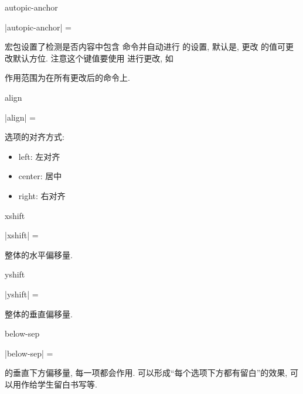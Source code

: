\documentclass{l3doc}
\begin{document}
\begin{documentation}
\begin{function}[added = 2021-12-25, updated = 2022-01-09]{autopic-anchor}
  \begin{syntax}
    |autopic-anchor| =  
  \end{syntax}
   宏包设置了检测是否内容中包含  命令并自动进行  的设置, 默认是, 更改  的值可更改默认方位.
  注意这个键值要使用  进行更改, 如
  \lstset{ linewidth = 0.4\linewidth }
  \begin{LaTeXdemo}
  \end{LaTeXdemo}
  作用范围为在所有更改后的命令上.
\end{function}
\begin{function}{align}
  \begin{syntax}
    |align| =  
  \end{syntax}
  选项的对齐方式:
  \begin{itemize}
    \item left: 左对齐
    \item center: 居中
    \item right: 右对齐
  \end{itemize}
\end{function}


\begin{function}{xshift}
  \begin{syntax}
    |xshift| = 
  \end{syntax}
  整体的水平偏移量.
\end{function}

\begin{function}[updated = 2021-12-25]{yshift}
  \begin{syntax}
    |yshift| = 
  \end{syntax}
  整体的垂直偏移量.
\end{function}

\begin{function}[added = 2021-12-25, updated = 2022-01-09]{below-sep}
  \begin{syntax}
    |below-sep| = 
  \end{syntax}
   的垂直下方偏移量, 每一项都会作用. 可以形成“每个选项下方都有留白”的效果, 可以用作给学生留白书写等.
\end{function}


\end{documentation}
\end{document}
